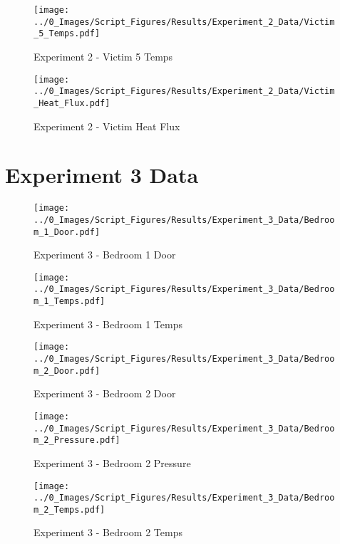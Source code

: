 	\clearpage

	\begin{figure}[H]
		\centering
		\texttt{[image: ../0\_Images/Script\_Figures/Results/Experiment\_2\_Data/Victim\_5\_Temps.pdf]}
		\caption[]{Experiment 2 - Victim 5 Temps}
	\end{figure}
 

	\begin{figure}[H]
		\centering
		\texttt{[image: ../0\_Images/Script\_Figures/Results/Experiment\_2\_Data/Victim\_Heat\_Flux.pdf]}
		\caption[]{Experiment 2 - Victim Heat Flux}
	\end{figure}
 
	\clearpage

\clearpage		\large
\section{Experiment 3 Data} \label{App:Exp3Results} 

	\begin{figure}[H]
		\centering
		\texttt{[image: ../0\_Images/Script\_Figures/Results/Experiment\_3\_Data/Bedroom\_1\_Door.pdf]}
		\caption[]{Experiment 3 - Bedroom 1 Door}
	\end{figure}
 

	\begin{figure}[H]
		\centering
		\texttt{[image: ../0\_Images/Script\_Figures/Results/Experiment\_3\_Data/Bedroom\_1\_Temps.pdf]}
		\caption[]{Experiment 3 - Bedroom 1 Temps}
	\end{figure}
 
	\clearpage

	\begin{figure}[H]
		\centering
		\texttt{[image: ../0\_Images/Script\_Figures/Results/Experiment\_3\_Data/Bedroom\_2\_Door.pdf]}
		\caption[]{Experiment 3 - Bedroom 2 Door}
	\end{figure}
 

	\begin{figure}[H]
		\centering
		\texttt{[image: ../0\_Images/Script\_Figures/Results/Experiment\_3\_Data/Bedroom\_2\_Pressure.pdf]}
		\caption[]{Experiment 3 - Bedroom 2 Pressure}
	\end{figure}
 
	\clearpage

	\begin{figure}[H]
		\centering
		\texttt{[image: ../0\_Images/Script\_Figures/Results/Experiment\_3\_Data/Bedroom\_2\_Temps.pdf]}
		\caption[]{Experiment 3 - Bedroom 2 Temps}
	\end{figure}
 

